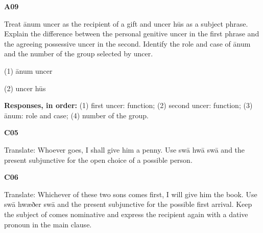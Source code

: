 \par\begin{minipage}{\linewidth}\raggedright
\textbf{A09}

Treat ānum uncer as the recipient of a gift and uncer hūs as a subject phrase. Explain the difference between the personal genitive uncer in the first phrase and the agreeing possessive uncer in the second. Identify the role and case of ānum and the number of the group selected by uncer.

(1) ānum uncer

(2) uncer hūs

\textbf{Responses, in order:} (1) first uncer: function; (2) second uncer: function; (3) ānum: role and case; (4) number of the group.

\end{minipage}\par\addvspace{4pt}

\par\begin{minipage}{\linewidth}\raggedright
\textbf{C05}

Translate: Whoever goes, I shall give him a penny. Use swā hwā swā and the present subjunctive for the open choice of a possible person.

\end{minipage}\par\addvspace{4pt}

\par\begin{minipage}{\linewidth}\raggedright
\textbf{C06}

Translate: Whichever of these two sons comes first, I will give him the book. Use swā hwæðer swā and the present subjunctive for the possible first arrival. Keep the subject of comes nominative and express the recipient again with a dative pronoun in the main clause.

\end{minipage}\par\addvspace{4pt}

